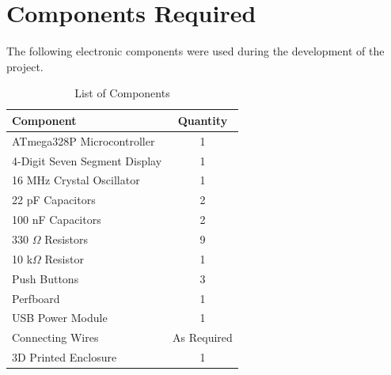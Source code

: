 \documentclass[12pt,a4paper]{article}
\begin{document}

\section{Components Required}

The following electronic components were used during the development of the project.

\begin{table}[H]

\centering

\caption{List of Components}

\begin{tabular}{|p{7cm}|c|}

\hline

\textbf{Component} & \textbf{Quantity}\\

\hline

ATmega328P Microcontroller & 1\\

\hline

4-Digit Seven Segment Display & 1\\

\hline

16 MHz Crystal Oscillator & 1\\

\hline

22 pF Capacitors & 2\\

\hline

100 nF Capacitors & 2\\

\hline

330 $\Omega$ Resistors & 9\\

\hline

10 k$\Omega$ Resistor & 1\\

\hline

Push Buttons & 3\\

\hline

Perfboard & 1\\

\hline

USB Power Module & 1\\

\hline

Connecting Wires & As Required\\

\hline

3D Printed Enclosure & 1\\

\hline

\end{tabular}

\end{table}
\end{document}

